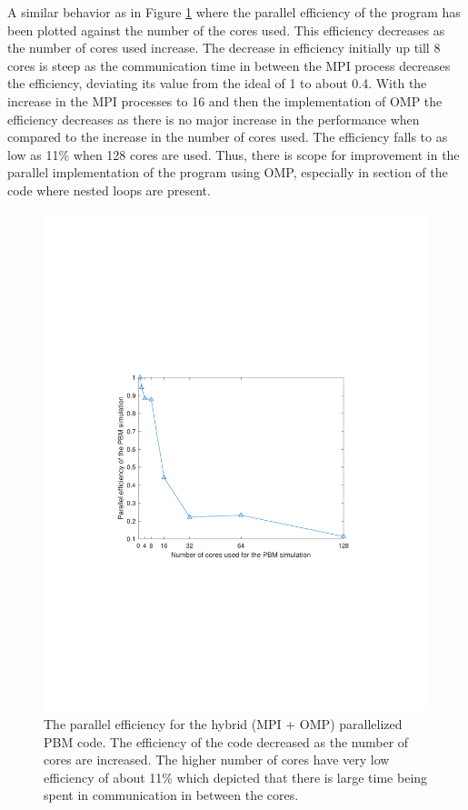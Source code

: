 \documentclass[preprint,11pt,authoryear]{elsarticle}
\begin{document}
A similar behavior as in Figure \ref{fig:rslts_PBM_parallel_efficiency} where the parallel 
efficiency of the program has been plotted against the number of the cores used. This efficiency 
decreases as the number of cores used increase. The decrease in efficiency initially up till 8 cores is steep as 
the communication time in between the MPI process decreases the efficiency, deviating its value from 
the ideal of 1 to about 0.4. With the increase in the MPI processes to 16 and then the 
implementation of OMP the efficiency decreases as there is no major increase in the performance 
when compared to the increase in the number of cores used. The efficiency falls to as low as 11\% 
when 128 cores are used. Thus, there is scope for improvement in the parallel implementation 
of the program using OMP, especially in section of the code where nested loops are present.

\begin{figure}
\centering
\includegraphics[scale=0.75]{rslsts_PBM_efficiency.pdf}
\caption{The parallel efficiency for the hybrid (MPI + OMP) parallelized PBM code. The efficiency of the 
code decreased as the number of cores are increased. The higher number of cores have very low 
efficiency of about 11\% which depicted that there is large time being spent in communication in 
between the cores.}
\label{fig:rslts_PBM_parallel_efficiency}
\end{figure}
\end{document}
